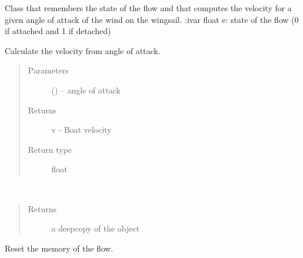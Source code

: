 \documentclass[letterpaper,10pt,english]{sphinxmanual}
\begin{document}
\begin{fulllineitems}
\label{\detokenize{package1:Hysteresis.Hysteresis}}
Class that remembers the state of the flow and that computes the velocity for a given angle of attack of the wind
on the wingsail.
:ivar float e: state of the flow (0 if attached and 1 if detached)

\begin{fulllineitems}
\label{\detokenize{package1:Hysteresis.Hysteresis.calculateSpeed}}
Calculate the velocity from angle of attack.
\begin{quote}\begin{description}
\item[{Parameters}] \leavevmode
{} () -- angle of attack

\item[{Returns}] \leavevmode
v - Boat velocity

\item[{Return type}] \leavevmode
float

\end{description}\end{quote}

\end{fulllineitems}


\begin{fulllineitems}
\label{\detokenize{package1:Hysteresis.Hysteresis.copy}}~\begin{quote}\begin{description}
\item[{Returns}] \leavevmode
a deepcopy of the object

\end{description}\end{quote}

\end{fulllineitems}


\begin{fulllineitems}
\label{\detokenize{package1:Hysteresis.Hysteresis.reset}}
Reset the memory of the flow.

\end{fulllineitems}


\end{fulllineitems}
\end{document}
